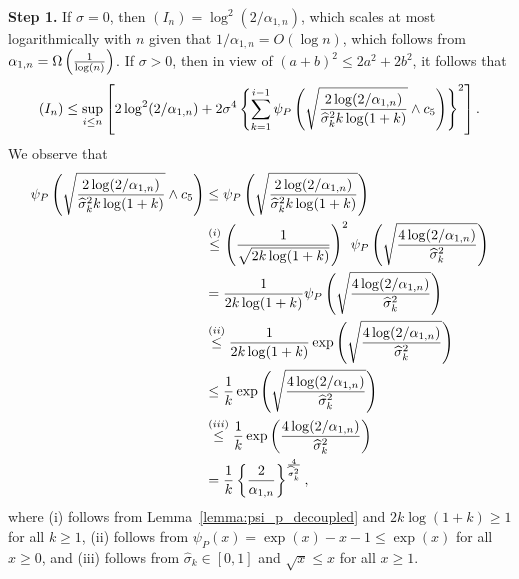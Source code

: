 \textbf{Step 1.} If $\sigma = 0$, then $(I_n) = \log^2(2/\alpha_{1,n})$, which scales at most logarithmically with $n$ given that $1/\alpha_{1, n} = O(\log n )$, which follows from $\alpha_{1, n} = \Omega \left( \frac{1}{\log(n)} \right)$. If $\sigma > 0$, then in view of $(a+b)^2 \leq 2a^2 + 2b^2$, it follows that
\begin{align*}
    (I_n) \leq \sup_{i \leq n} \left[ 2\log^2(2/\alpha_{1,n}) + 2\sigma^4\left\{\sum_{k=1}^{i-1} \psi_P\left(\sqrt\frac{2\log(2/\alpha_{1,n})}{\widehat \sigma_{k}^2 k \log (1+k)}\wedge c_5\right)\right\}^2\right].
\end{align*}
We observe that 
\begin{align*}
    \psi_P\left(\sqrt\frac{2\log(2/\alpha_{1,n})}{\widehat \sigma_{k}^2 k \log (1+k)}\wedge c_5\right) &\stackrel{}{\leq} \psi_P\left(\sqrt\frac{2\log(2/\alpha_{1,n})}{\widehat \sigma_{k}^2 k \log (1+k)}\right)
    \\&\stackrel{(i)}{\leq}\left( \frac{1}{\sqrt{2k\log(1+k)}}\right)^2\psi_P\left(\sqrt\frac{4\log(2/\alpha_{1,n})}{\widehat \sigma_{k}^2 }\right)
    \\&= \frac{1}{2k\log(1+k)} \psi_P\left(\sqrt\frac{4\log(2/\alpha_{1,n})}{\widehat \sigma_{k}^2 }\right)
    \\&\stackrel{(ii)}{\leq} \frac{1}{2k\log(1+k)} \exp\left(\sqrt\frac{4\log(2/\alpha_{1,n})}{\widehat \sigma_{k}^2 }\right)
     \\&\stackrel{}{\leq} \frac{1}{k} \exp\left(\sqrt\frac{4\log(2/\alpha_{1,n})}{\widehat \sigma_{k}^2 }\right)
     \\&\stackrel{(iii)}{\leq} \frac{1}{k} \exp\left(\frac{4\log(2/\alpha_{1,n})}{\widehat \sigma_{k}^2 }\right)
     \\&\stackrel{}{=} \frac{1}{k} \left\{ \frac{2}{\alpha_{1,n}}\right\}^{\frac{4}{\widehat \sigma_{k}^2 }},
\end{align*}
where (i) follows from Lemma~\ref{lemma:psi_p_decoupled} and $2k \log(1 +k)\geq1$ for all $k \geq 1$, (ii) follows from $\psi_P(x) = \exp(x) - x - 1 \leq \exp(x)$ for all $x \geq 0$, and (iii) follows from $\widehat\sigma_{k} \in [0,1]$ and $\sqrt x \leq x$ for all $x \geq 1$.

